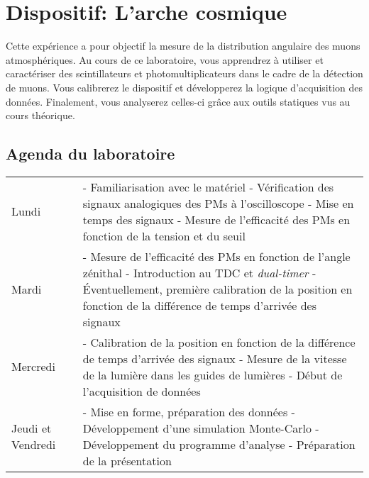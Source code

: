 \section{Dispositif: L'arche cosmique}
\label{sect:Muon_arche}

Cette expérience a pour objectif la mesure de la distribution angulaire des muons atmosphériques.
Au cours de ce laboratoire, vous apprendrez à utiliser et caractériser des scintillateurs et photomultiplicateurs dans le cadre de la détection de muons.
Vous calibrerez le dispositif et développerez la logique d'acquisition des données.
Finalement, vous analyserez celles-ci grâce aux outils statiques vus au cours théorique.

\subsection{Agenda du laboratoire}
\begin{tabular}{p{0.2\linewidth} p{0.8\linewidth}}
Lundi & - Familiarisation avec le matériel\newline
		- Vérification des signaux analogiques des PMs à l'oscilloscope\newline
		- Mise en temps des signaux\newline
		- Mesure de l'efficacité des PMs en fonction de la tension et du seuil\\

Mardi & - Mesure de l'efficacité des PMs en fonction de l'angle zénithal\newline
		- Introduction au TDC et \textit{dual-timer}\newline
		- Éventuellement, première calibration de la position en fonction de la différence de temps d'arrivée des signaux\\

Mercredi & - Calibration de la position en fonction de la différence de temps d'arrivée des signaux\newline
		- Mesure de la vitesse de la lumière dans les guides de lumières\newline
		- Début de l'acquisition de données\\

Jeudi et Vendredi & - Mise en forme, préparation des données\newline
		- Développement d'une simulation Monte-Carlo\newline
		- Développement du programme d'analyse\newline
		- Préparation de la présentation\\
\end{tabular} 

